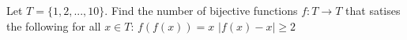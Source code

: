 Let $T = \{1,2,...,10\}$. Find the number of bijective functions $f : T\to T$  that satises the following for all $x \in T$:
$f(f(x)) = x$
$|f(x) - x| \ge 2$